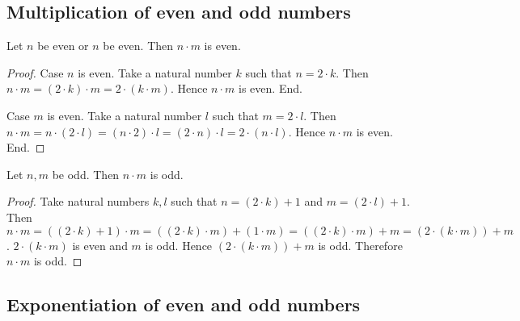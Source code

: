 \documentclass[../../arithmetic.tex]{subfiles}
\begin{document}
  \subsection{Multiplication of even and odd numbers}

  \begin{forthel}
    \begin{proposition}\label{Arithmetic_03_07_673515}
      Let $n$ be even or $n$ be even.
      Then $n \cdot m$ is even.
    \end{proposition}
    \begin{proof}
      Case $n$ is even.
        Take a natural number $k$ such that $n = 2 \cdot k$.
        Then $n \cdot m =
        (2 \cdot k) \cdot m =
        2 \cdot (k \cdot m)$.
        Hence $n \cdot m$ is even.
      End.

      Case $m$ is even.
        Take a natural number $l$ such that $m = 2 \cdot l$.
        Then $n \cdot m =
        n \cdot (2 \cdot l) =
        (n \cdot 2) \cdot l =
        (2 \cdot n) \cdot l =
        2 \cdot (n \cdot l)$.
        Hence $n \cdot m$ is even.
      End.
    \end{proof}

    \begin{proposition}\label{Arithmetic_03_07_349450}
      Let $n, m$ be odd.
      Then $n \cdot m$ is odd.
    \end{proposition}
    \begin{proof}
      Take natural numbers $k, l$ such that $n = (2 \cdot k) + 1$ and $m = (2 \cdot l) + 1$.
      Then $n \cdot m =
      ((2 \cdot k) + 1) \cdot m =
      ((2 \cdot k) \cdot m) + (1 \cdot m) =
      ((2 \cdot k) \cdot m) + m =
      (2 \cdot (k \cdot m)) + m$.
      $2 \cdot (k \cdot m)$ is even and $m$ is odd.
      Hence $(2 \cdot (k \cdot m)) + m$ is odd.
      Therefore $n \cdot m$ is odd.
    \end{proof}
  \end{forthel}


  \subsection{Exponentiation of even and odd numbers}
\end{document}
